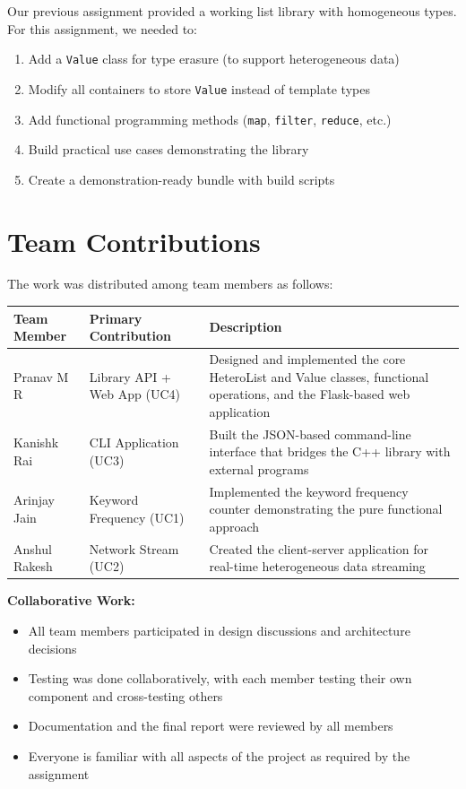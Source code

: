 \documentclass[11pt,a4paper]{article}
\begin{document}
Our previous assignment provided a working list library with homogeneous types. For this assignment, we needed to:
\begin{enumerate}
    \item Add a \texttt{Value} class for type erasure (to support heterogeneous data)
    \item Modify all containers to store \texttt{Value} instead of template types
    \item Add functional programming methods (\texttt{map}, \texttt{filter}, \texttt{reduce}, etc.)
    \item Build practical use cases demonstrating the library
    \item Create a demonstration-ready bundle with build scripts
\end{enumerate}

\section{Team Contributions}

The work was distributed among team members as follows:

\begin{center}
\begin{tabular}{|l|l|p{7cm}|}
\hline
\textbf{Team Member} & \textbf{Primary Contribution} & \textbf{Description} \\
\hline
Pranav M R & Library API + Web App (UC4) & Designed and implemented the core HeteroList and Value classes, functional operations, and the Flask-based web application \\
\hline
Kanishk Rai & CLI Application (UC3) & Built the JSON-based command-line interface that bridges the C++ library with external programs \\
\hline
Arinjay Jain & Keyword Frequency (UC1) & Implemented the keyword frequency counter demonstrating the pure functional approach \\
\hline
Anshul Rakesh & Network Stream (UC2) & Created the client-server application for real-time heterogeneous data streaming \\
\hline
\end{tabular}
\end{center}

\textbf{Collaborative Work:}
\begin{itemize}
    \item All team members participated in design discussions and architecture decisions
    \item Testing was done collaboratively, with each member testing their own component and cross-testing others
    \item Documentation and the final report were reviewed by all members
    \item Everyone is familiar with all aspects of the project as required by the assignment
\end{itemize}
\end{document}
